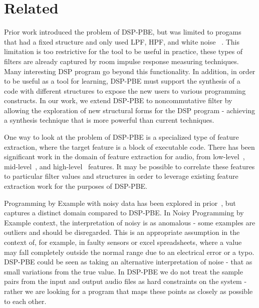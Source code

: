 \section{Related}

Prior work introduced the problem of DSP-PBE, but was limited to progams that had a fixed structure and only used LPF, HPF, and white noise~\cite{SantolucitoFARM} .
This limitation is too restrictive for the tool to be useful in practice, these types of filters are already captured by room impulse response measuring techniques.
Many interesting DSP program go beyond this functionality.
In addition, in order to be useful as a tool for learning, DSP-PBE must support the synthesis of a code with different structures to expose the new users to various programming constructs.
In our work, we extend DSP-PBE to noncommutative filter by allowing the exploration of new structural forms for the DSP program - achieving a synthesis technique that is more powerful than current techniques.

One way to look at the problem of DSP-PBE is a specialized type of feature extraction, where the target feature is a block of executable code.
There has been significant work in the domain of feature extraction for audio, from low-level~\cite{muller2011chroma}, mid-level~\cite{AljanakiS18}, and high-level~\cite{PandaMP18, mathieu2010yaafe, lidy2005evaluation} features.
It may be possible to correlate these features to particular filter values and structures in order to leverage existing feature extraction work for the purposes of DSP-PBE.


Programming by Example with noisy data has been explored in prior~\cite{raychev2016learning}, but captures a distinct domain compared to DSP-PBE.
In Noisy Programming by Example context, the interpretation of noisy is as anomalous - some examples are outliers and should be disregarded.
This is an appropriate assumption in the context of, for example, in faulty sensors or excel spreadsheets, where a value may fall completely outside the normal range due to an electrical error or a typo.
DSP-PBE could be seen as taking an alternative interpretation of noise - that as small variations from the true value.
In DSP-PBE we do not treat the sample pairs from the input and output audio files as hard constraints on the system - rather we are looking for a program that maps these points as closely as possible to each other.

